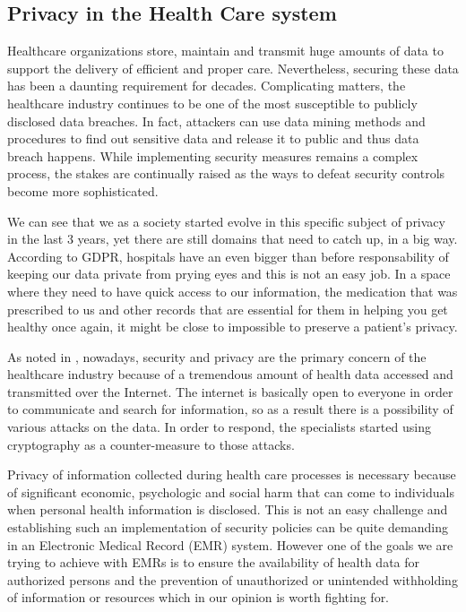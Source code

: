 \subsection{Privacy in the Health Care system}
\label{sec:ch2sec5subsec2}

\par Healthcare organizations store, maintain and transmit huge amounts of data to support the delivery of efficient and proper care. Nevertheless, securing these data has been a daunting requirement for decades. Complicating matters, the healthcare industry continues to be one of the most susceptible to publicly disclosed data breaches. In fact, attackers can use data mining methods and procedures to find out sensitive data and release it to public and thus data breach happens. While implementing security measures remains a complex process, the stakes are continually raised as the ways to defeat security controls become more sophisticated. \cite{abouelmehdi2017big}

We can see that we as a society started evolve in this specific subject of privacy in the last 3 years, yet there are still domains that need to catch up, in a big way. According to GDPR, hospitals have an even bigger than before responsability of keeping our data private from prying eyes and this is not an easy job. In a space where they need to have quick access to our information, the medication that was prescribed to us and other records that are essential for them in helping you get healthy once again, it might be close to impossible to preserve a patient's privacy. 

As noted in \cite{hathaliya2020exhaustive}, nowadays, security and privacy are the primary concern of the healthcare industry because of a tremendous amount of health data accessed and transmitted over the Internet. The internet is basically open to everyone in order to communicate and search for information, so as a result there is a possibility of various attacks on the data. In order to respond, the specialists started using cryptography as a counter-measure to those attacks.

Privacy of information collected during health care processes is necessary because of significant economic, psychologic and social harm that can come to individuals when personal health information is disclosed. \cite{barrows1996privacy} This is not an easy challenge and establishing such an implementation of security policies can be quite demanding in an Electronic Medical Record (EMR) system. However one of the goals we are trying to achieve with EMRs is to ensure the availability of health data for authorized persons and the prevention of unauthorized or unintended withholding of information or resources \cite{barrows1996privacy} which in our opinion is worth fighting for.

